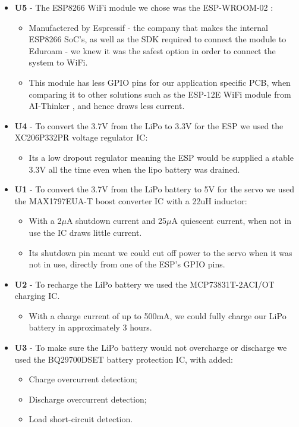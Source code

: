 \documentclass[onecolumn]{IEEEtran}
\begin{document}
{        \begin{itemize}
            \item \textbf{U5} - The ESP8266 WiFi module we chose was the ESP-WROOM-02 \cite{esp}:
                \begin{itemize}
                    \item Manufactered by Espressif - the company that makes the internal ESP8266 SoC's, as well as the SDK required to connect the module to Eduroam - we knew it was the safest option in order to connect the system to WiFi. 
                    \item This module has less GPIO pins for our application specific PCB, when comparing it to other solutions such as the ESP-12E WiFi module from AI-Thinker \cite{esp12e}, and hence draws less current.
                \end{itemize}
            \item \textbf{U4} - To convert the 3.7V from the LiPo  to 3.3V for the ESP we used the XC206P332PR \cite{vreg} voltage regulator IC:
            \begin{itemize}
                \item Its a low dropout regulator meaning the ESP would be supplied a stable 3.3V all the time even when the lipo battery was drained.
            \end{itemize}
            \item \textbf{U1} - To convert the 3.7V from the LiPo battery to 5V for the servo we used the MAX1797EUA-T \cite{boostconverter} boost converter IC with a 22uH inductor:
                \begin{itemize}
                    \item With a 2$\mu$A shutdown current and 25$\mu$A quiescent current, when not in use the IC draws little current.
                    \item Its shutdown pin meant we could cut off power to the servo when it was not in use, directly from one of the ESP’s GPIO pins.
                \end{itemize}
            \item \textbf{U2} - To recharge the LiPo battery we used the MCP73831T-2ACI/OT \cite{charge} charging IC.
                \begin{itemize}
                    \item With a charge current of up to 500mA, we could fully charge our LiPo battery in approximately 3 hours.
                \end{itemize}
            \item \textbf{U3} - To make sure the LiPo battery would not overcharge or discharge we used the BQ29700DSET \cite{protection} battery protection IC, with added:
                \begin{itemize}
                    \item Charge overcurrent detection;
                    \item Discharge overcurrent detection;
                    \item Load short-circuit detection.
                \end{itemize}
        \end{itemize}


}
\end{document}
